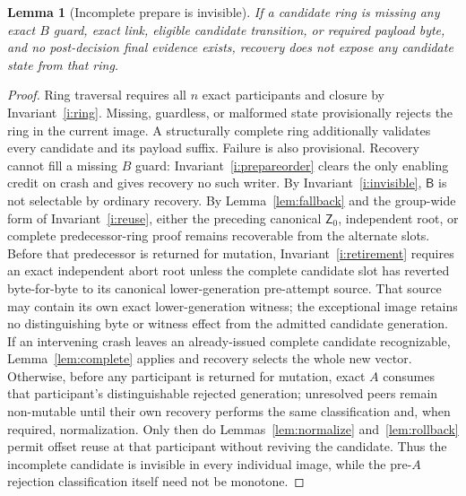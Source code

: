 \documentclass[10pt,twocolumn]{article}
\newtheorem{lemma}{Lemma}
\theoremstyle{remark}
\newcommand{\Prepared}{\mathsf{B}}
\newcommand{\Zero}{\mathsf{Z}}
\begin{document}
\begin{lemma}[Incomplete prepare is invisible]\label{lem:incomplete}
If a candidate ring is missing any exact $B$ guard, exact link, eligible candidate transition, or
required payload byte, and no post-decision final evidence exists, recovery does not expose any
candidate state from that ring.
\end{lemma}
\begin{proof}
Ring traversal requires all $n$ exact participants and closure by Invariant~\ref{i:ring}. Missing,
guardless, or malformed state provisionally rejects the ring in the current image. A structurally
complete ring additionally validates every candidate and its payload suffix. Failure is also
provisional. Recovery cannot fill a missing $B$ guard: Invariant~\ref{i:prepareorder} clears the
only enabling credit on crash and gives recovery no such writer. By
Invariant~\ref{i:invisible}, $\Prepared$ is not selectable by ordinary recovery. By
Lemma~\ref{lem:fallback} and the group-wide form of Invariant~\ref{i:reuse}, either the preceding
canonical $\Zero_0$, independent root, or complete predecessor-ring proof remains recoverable from
the alternate slots. Before that predecessor is returned for mutation,
Invariant~\ref{i:retirement} requires an exact independent abort root unless the complete candidate
slot has reverted byte-for-byte to its canonical lower-generation pre-attempt source. That source
may contain its own exact lower-generation witness; the exceptional image retains no distinguishing
  byte or witness effect from the admitted candidate generation. If an intervening crash leaves an
  already-issued complete candidate recognizable, Lemma~\ref{lem:complete} applies and recovery
  selects the whole new vector. Otherwise, before any participant is returned for mutation, exact
  $A$ consumes that participant's distinguishable rejected generation; unresolved peers remain
  non-mutable until their own recovery performs the same classification and, when required,
normalization. Only then do Lemmas~\ref{lem:normalize} and~\ref{lem:rollback} permit offset reuse
at that participant without reviving the candidate. Thus the incomplete candidate is invisible in
every individual image, while the pre-$A$ rejection classification itself need not be monotone.
\end{proof}
\end{document}
